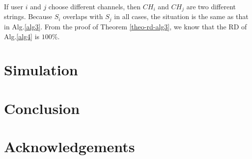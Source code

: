 \documentclass[10pt, conference, letterpaper]{IEEEtran}
\begin{document}
\begin{IEEEproof}
If user $i$ and $j$ choose different channels, then $CH_i$ and $CH_j$ are two different strings. Because $S_i$ overlaps with $S_j$ in all cases, the situation is the same as that in Alg.\ref{alg3}. From the proof of Theorem \ref{theo-rd-alg3}, we know that the RD of Alg.\ref{alg4} is $100\%$.
\end{IEEEproof}

\section{Simulation}

\section{Conclusion}

\section{Acknowledgements}



%
%
\end{document}
